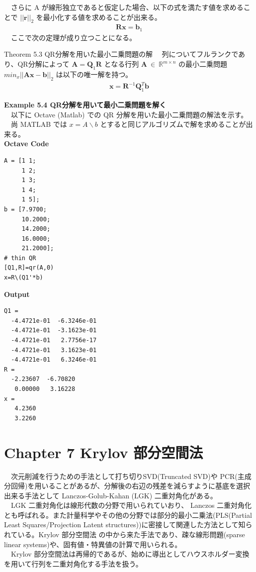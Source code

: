\documentclass[a4paper,10pt]{jarticle}
\begin{document}
　さらに A が線形独立であると仮定した場合、以下の式を満たす値を求めることで \(||\bm{r}||_2\) を最小化する値を求めることが出来る。\\
\begin{align*}
\bm{R}\bm{x}=\bm{b}_1
\end{align*}
　ここで次の定理が成り立つことになる。\\
\begin{itembox}[l]{Theorem 5.3 QR分解を用いた最小二乗問題の解}
　列についてフルランクであり、QR分解によって $\bm{A}=\bm{Q}_1\bm{R}$ となる行列 $\bm{A}\ \in\ \mathbb{R}^{m\times n}$ の最小二乗問題 $min_x||\bm{A}\bm{x}-\bm{b}||_2$ は以下の唯一解を持つ。
\begin{align*}
\bm{x}=\bm{R}^{-1}\bm{Q}_1^T\bm{b}
\end{align*}
\end{itembox}


\textbf{Example 5.4 QR分解を用いて最小二乗問題を解く}\\

　以下に Octave (Matlab) での QR 分解を用いた最小二乗問題の解法を示す。\\
　尚 MATLAB では \(x=A\backslash b\) とすると同じアルゴリズムで解を求めることが出来る。\\

\textbf{Octave Code}\\
\begin{verbatim}
A = [1 1;
     1 2; 
     1 3;
     1 4;
     1 5];
b = [7.9700;
     10.2000;
     14.2000;
     16.0000;
     21.2000];
# thin QR
[Q1,R]=qr(A,0)
x=R\(Q1'*b)
\end{verbatim}

\textbf{Output}\\
\begin{verbatim}
Q1 =
  -4.4721e-01  -6.3246e-01
  -4.4721e-01  -3.1623e-01
  -4.4721e-01   2.7756e-17
  -4.4721e-01   3.1623e-01
  -4.4721e-01   6.3246e-01
R =
  -2.23607  -6.70820
   0.00000   3.16228
x =
   4.2360
   3.2260
\end{verbatim}

\section{Chapter 7 Krylov 部分空間法}
\label{sec:org39cd53f}
　次元削減を行うための手法として打ち切りSVD(Truncated SVD)や PCR(主成分回帰)を用いることがあるが、分解後の右辺の残差を減らすように基底を選択出来る手法として Lanczos-Golub-Kahan (LGK) 二重対角化がある。\\
　LGK 二重対角化は線形代数の分野で用いられていおり、 Lanczos 二重対角化とも呼ばれる。また計量科学やその他の分野では部分的最小二乗法(PLS(Partial Least Squares/Projection Latent structures))に密接して関連した方法として知られている。Krylov 部分空間法 の中から来た手法であり、疎な線形問題(sparse linear systems)や、固有値・特異値の計算で用いられる。\\
　Krylov 部分空間法は再帰的であるが、始めに導出としてハウスホルダー変換を用いて行列を二重対角化する手法を扱う。\\
\end{document}
